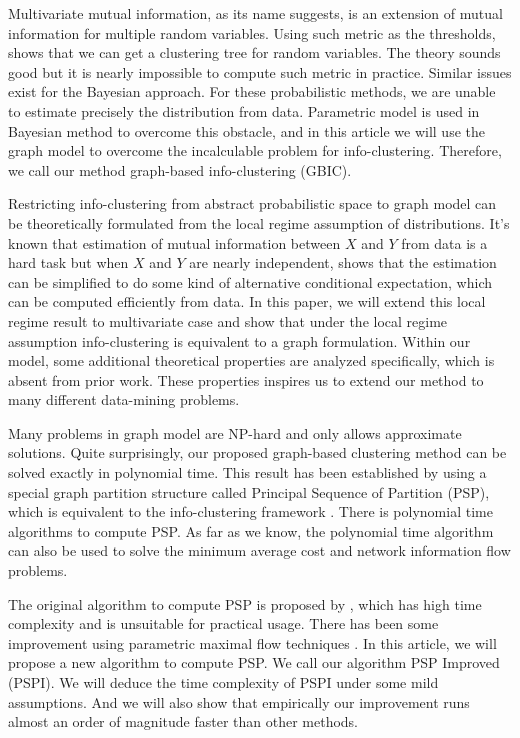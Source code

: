 Multivariate mutual information, as its name suggests, is an extension of mutual information for multiple
random variables. Using such metric as the thresholds, \citet{ic2016} shows that we can get a clustering
tree for random variables. The theory sounds good but it is nearly impossible to compute such metric
in practice. Similar issues exist for the Bayesian approach. For these probabilistic methods, we
are unable to estimate precisely the distribution from data. Parametric model is used in Bayesian
method to overcome this obstacle, and in this article we will use the graph model to overcome the incalculable problem for info-clustering.
Therefore, we call our method graph-based info-clustering (GBIC).

Restricting info-clustering from abstract probabilistic space to graph model can be theoretically formulated from the local regime assumption of distributions. It's known that estimation of mutual information between $X$ and $Y$ from data is a hard task but when $X$ and $Y$ are nearly independent, \citet{huang2017information} shows that the estimation can be simplified to do some kind of alternative conditional expectation, which can be computed efficiently from data. In this paper, we will extend this local regime result to multivariate case and show that under the local regime assumption info-clustering is equivalent to a graph formulation. Within our model, some additional theoretical properties are analyzed specifically, which is absent from prior work. These properties inspires us to extend our method to many different data-mining problems.


Many problems in graph model are NP-hard and only allows approximate solutions. Quite surprisingly, our proposed graph-based clustering method can be solved exactly in polynomial time.
This result has been established by using a special graph partition structure called Principal Sequence of Partition (PSP), which is equivalent to the info-clustering framework \citep{ic2016}. There is polynomial time algorithms to compute PSP. As far as we know, the polynomial time algorithm can also be used to solve the minimum average cost \citep{mac} and network information flow \citep{pin} problems.

The original algorithm to compute PSP is proposed by
\citet{narayanan}, which has high time complexity and is unsuitable for practical usage.
There has been some improvement
using parametric maximal flow techniques \citep{kolmogorov}. In this article, we will propose a new algorithm to compute PSP. We call our algorithm PSP Improved (PSPI). We will deduce the time complexity of PSPI under some mild assumptions. And we will also show that empirically our improvement runs almost an order of magnitude faster than other methods.



